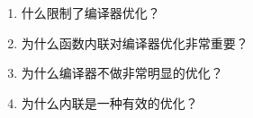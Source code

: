 \begin{enumerate}
\item 
什么限制了编译器优化？

\item 
为什么函数内联对编译器优化非常重要？

\item 
为什么编译器不做非常明显的优化？

\item
为什么内联是一种有效的优化？
	
\end{enumerate}